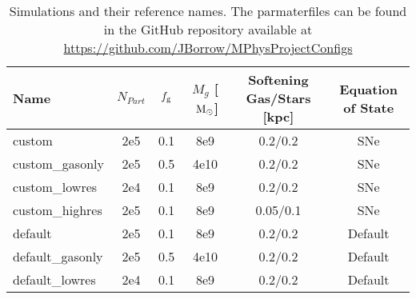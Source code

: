 \begin{table}
    \centering

    \begin{tabular}{l|c|c|c|c|c}

    Name & $N_{Part}$ & $f_\mathrm{g}$ & $M_g$ [$~\mathrm{M}_{\odot}$] & Softening Gas/Stars [kpc] & Equation of State \\
    \hline
    custom & 2e5 & 0.1 & 8e9 & 0.2/0.2 & SNe \\
    custom\_gasonly & 2e5 & 0.5 & 4e10 & 0.2/0.2 & SNe \\
    custom\_lowres & 2e4 & 0.1 & 8e9 & 0.2/0.2 & SNe \\
    custom\_highres & 2e5 & 0.1 & 8e9 & 0.05/0.1 & SNe \\
    default & 2e5 & 0.1 & 8e9 & 0.2/0.2 & Default \\
    default\_gasonly & 2e5 & 0.5 & 4e10 & 0.2/0.2 & Default \\
    default\_lowres & 2e4 & 0.1 & 8e9 & 0.2/0.2 & Default \\

    \end{tabular}

    \caption{Simulations and their reference names. The parmaterfiles can be found in the GitHub repository available at \url{https://github.com/JBorrow/MPhysProjectConfigs}}
    \label{tab:sims}
\end{table}
